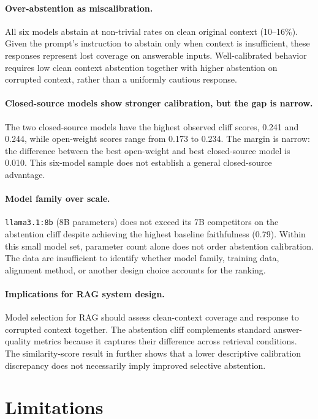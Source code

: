 \documentclass[11pt]{article}
\begin{document}
\paragraph{Over-abstention as miscalibration.}
All six models abstain at non-trivial rates on clean original context (10--16\%). Given
the prompt's instruction to abstain only when context is insufficient, these responses
represent lost coverage on answerable inputs. Well-calibrated behavior requires low clean
context abstention together with higher abstention on corrupted context, rather than a
uniformly cautious response.

\paragraph{Closed-source models show stronger calibration, but the gap is narrow.}
The two closed-source models have the highest observed cliff scores, 0.241 and 0.244,
while open-weight scores range from 0.173 to 0.234. The margin is narrow: the difference
between the best open-weight and best closed-source model is 0.010. This six-model sample
does not establish a general closed-source advantage.

\paragraph{Model family over scale.}
\texttt{llama3.1:8b} (8B parameters) does not exceed its 7B competitors on the
abstention cliff despite achieving the highest baseline faithfulness (0.79).
Within this small model set, parameter count alone does not order abstention calibration.
The data are insufficient to identify whether model family, training data, alignment
method, or another design choice accounts for the ranking.

\paragraph{Implications for RAG system design.}
Model selection for RAG should assess clean-context coverage and response to corrupted
context together. The abstention cliff complements standard answer-quality metrics because
it captures their difference across retrieval conditions. The similarity-score result in
 further shows that a lower descriptive calibration discrepancy does
not necessarily imply improved selective abstention.
\FloatBarrier
\section{Limitations}
\label{sec:limitations}
\end{document}

